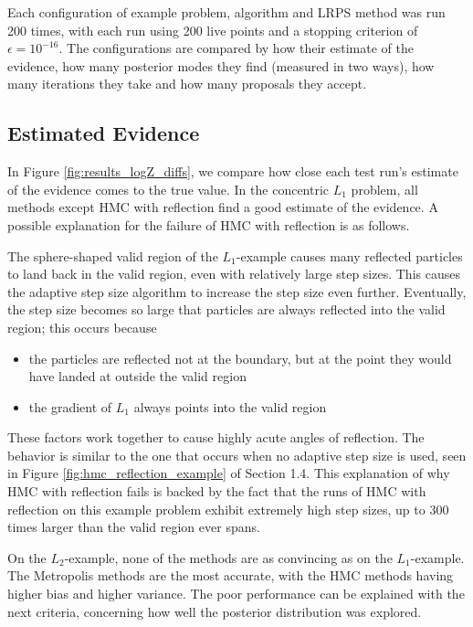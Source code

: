 \documentclass[12pt, a4paper]{report}
\begin{document}
Each configuration of example problem, algorithm and LRPS method was run 200 times, with each run using 200 live points and a stopping criterion of $\epsilon = 10^{-16}$.
The configurations are compared by how their estimate of the evidence, how many posterior modes they find (measured in two ways), how many iterations they take and how many proposals they accept.

\subsection{Estimated Evidence}
In Figure \ref{fig:results_logZ_diffs}, we compare how close each test run's estimate of the evidence comes to the true value.
In the concentric $L_1$ problem, all methods except HMC with reflection find a good estimate of the evidence.
A possible explanation for the failure of HMC with reflection is as follows.

The sphere-shaped valid region of the $L_1$-example causes many reflected particles to land back in the valid region, even with relatively large step sizes.
This causes the adaptive step size algorithm to increase the step size even further.
Eventually, the step size becomes so large that particles are always reflected into the valid region; this occurs because
\begin{itemize}
    \item the particles are reflected not at the boundary, but at the point they would have landed at outside the valid region
    \item the gradient of $L_1$ always points into the valid region
\end{itemize}
These factors work together to cause highly acute angles of reflection.
The behavior is similar to the one that occurs when no adaptive step size is used, seen in Figure \ref{fig:hmc_reflection_example} of Section 1.4.
This explanation of why HMC with reflection fails is backed by the fact that the runs of HMC with reflection on this example problem exhibit extremely high step sizes, up to 300 times larger than the valid region ever spans.

On the $L_2$-example, none of the methods are as convincing as on the $L_1$-example.
The Metropolis methods are the most accurate, with the HMC methods having higher bias and higher variance.
The poor performance can be explained with the next criteria, concerning how well the posterior distribution was explored.
\end{document}
